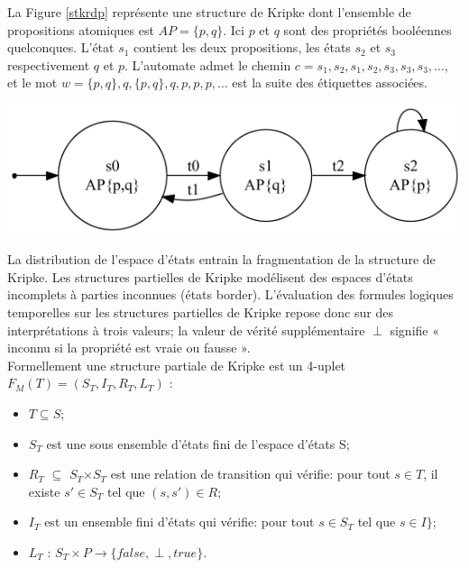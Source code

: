 La Figure \ref{stkrdp} représente une structure de Kripke dont l'ensemble de propositions atomiques est ${\displaystyle AP=\{p,q\}}$. Ici ${\displaystyle p}$   et ${\displaystyle q}$  sont des propriétés booléennes quelconques. L'état \emph{$s_1$} contient les deux propositions, les états \emph{$s_2$} et \emph{$s_3$} respectivement ${\displaystyle q}$  et ${\displaystyle p}$. L'automate admet le chemin ${\displaystyle c=s_1,s_2,s_1,s_2,s_3,s_3,s_3,\ldots }$, et le mot ${\displaystyle w=\{p,q\},q,\{p,q\},q,p,p,p,\ldots }$ est la suite des étiquettes associées.

\begin{center}
	\includegraphics[scale=0.4]{img/stk.PNG}
	 \label{stkrdp}
 \end{center}
 
 
La distribution de l'espace d'états entrain la fragmentation de la structure de Kripke. Les structures partielles de Kripke modélisent des espaces d'états incomplets à parties inconnues (états border). L'évaluation des formules logiques temporelles sur les structures partielles de Kripke repose donc sur des interprétations à trois valeurs; la valeur de vérité supplémentaire \textbf{$\perp$ }  signifie « inconnu si la propriété est vraie ou fausse ».\\
Formellement une structure partiale de Kripke est un 4-uplet \\${\displaystyle F_M(T) = (S_T , I_T , R_T , L_T )}$ \citep{depriester2011bouneb}:
\begin{itemize}
	\item $T \subseteq S $;
	\item \textbf{$S_T$}  est une sous ensemble d'états fini de l'espace d'états S;
	\item \textbf{$R_T$} $\subseteq$ \textbf{$S_T$}$\times$\textbf{$S_T$}  est une relation de transition qui vérifie: pour tout ${\displaystyle s\in T}$, il existe ${\displaystyle s'\in S_T} $ tel que ${\displaystyle (s,s')\in R}$;
	\item $I_T$ est un ensemble fini d'états qui vérifie: pour tout $ s \in S_T $ tel que $ s \in I \}$;
	\item $ L_T$ : $S_T \times P \rightarrow \{ false, \perp , true \} $.
\end{itemize}

